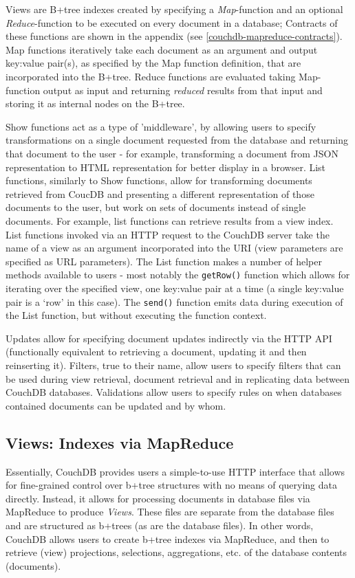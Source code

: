 Views are B+tree indexes created by specifying a \textit{Map}-function and an optional \textit{Reduce}-function to be executed on every document in a database; Contracts of these functions are shown in the appendix (see \ref{couchdb-mapreduce-contracts}). Map functions iteratively take each document as an argument and output key:value pair(s), as specified by the Map function definition, that are incorporated into the B+tree. Reduce functions are evaluated taking Map-function output as input and returning \textit{reduced} results from that input and storing it as internal nodes on the B+tree.

Show functions act as a type of 'middleware', by allowing users to specify transformations on a single document requested from the database and returning that document to the user - for example, transforming a document from JSON representation to HTML representation for better display in a browser. List functions, similarly to Show functions, allow for transforming documents retrieved from CoucDB and presenting a different representation of those documents to the user, but work on sets of documents instead of single documents. For example, list functions can retrieve results from a view index. List functions invoked via an HTTP request to the CouchDB server take the name of a view as an argument incorporated into the URI (view parameters are specified as URL parameters). The List function makes a number of helper methods available to users - most notably the \texttt{getRow()} function which allows for iterating over the specified view, one key:value pair at a time (a single key:value pair is a `row' in this case). The \texttt{send()} function emits data during execution of the List function, but without executing the function context.

Updates allow for specifying document updates indirectly via the HTTP API (functionally equivalent to retrieving a document, updating it and then reinserting it). Filters, true to their name, allow users to specify filters that can be used during view retrieval, document retrieval and in replicating data between CouchDB databases. Validations allow users to specify rules on when databases contained documents can be updated and by whom.

\subsection{Views: Indexes via MapReduce}
Essentially, CouchDB provides users a simple-to-use HTTP interface that allows for fine-grained control over b+tree structures with no means of querying data directly. Instead, it allows for processing documents in database files via MapReduce to produce \textit{Views}. These files are separate from the database files and are structured as b+trees (as are the database files). In other words, CouchDB allows users to create b+tree indexes via MapReduce, and then to retrieve (view) projections, selections, aggregations, etc. of the database contents (documents).

